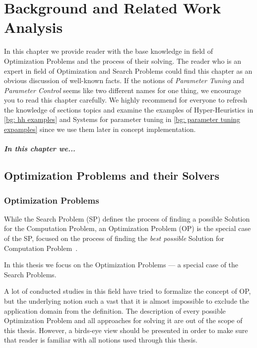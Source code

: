 \chapter{Background and Related Work Analysis}\label{bg}
In this chapter we provide reader with the base knowledge in field of Optimization Problems and the process of their solving.
The reader who is an expert in field of Optimization and Search Problems could find this chapter as an obvious discussion of well-known facts. If the notions of \textit{Parameter Tuning} and \textit{Parameter Control} seems like two different names for one thing, we encourage you to read this chapter carefully.
We highly recommend for everyone to refresh the knowledge of sections topics and examine the examples of Hyper-Heuristics in \ref{bg: hh examples} and Systems for parameter tuning in \ref{bg: parameter tuning expamples} since we use them later in concept implementation.

\paragraph{In this chapter we...} 


\section{Optimization Problems and their Solvers}\label{bg:opt problems and solvers}


\subsection{Optimization Problems}\label{BG: subsection OPs}
While the Search Problem (SP) defines the process of finding a possible Solution for the Computation Problem, an Optimization Problem (OP) is the special case of the SP, focused on the process of finding the \emph{best possible} Solution for Computation Problem~\cite{goldreich2010p}. 


In this thesis we focus on the Optimization Problems — a special case of the Search Problems.


A lot of conducted studies in this field have tried to formalize the concept of OP, but the underlying notion such a vast that it is almost impossible to exclude the application domain from the definition. The description of every possible Optimization Problem and all approaches for solving it are out of the scope of this thesis. However, a birds-eye view should be presented in order to make sure that reader is familiar with all notions used through this thesis. 


